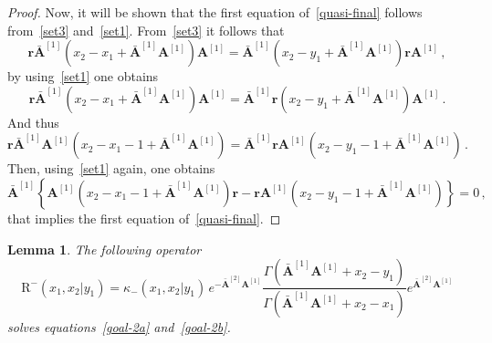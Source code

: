 \documentclass[11pt]{article}
\numberwithin{equation}{section}
\newtheorem{lemma}[theorem]{Lemma}
\newcommand{\OA}{\mathbf{A}}
\newcommand{\OAD}{\mathbf{\bar{A}}}
\newcommand{\abrOSCR}{\mathrm{R}}
\begin{document}
\begin{proof}
Now, it will be shown that the first equation of~\eqref{quasi-final} follows from~\eqref{set3} and~\eqref{set1}. From~\eqref{set3} it follows that
\begin{equation}
    	\mathbf{r}{\OAD}^{[1]}(x_{2}-x_{1}+\OAD^{[1]}\OA^{[1]})\OA^{[1]}={\OAD}^{[1]}(x_{2}-y_{1}+\OAD^{[1]}\OA^{[1]})\mathbf{r}\OA^{[1]}\,,
\end{equation}
by using~\eqref{set1} one obtains
\begin{equation}
    	\mathbf{r}{\OAD}^{[1]}(x_{2}-x_{1}+\OAD^{[1]}\OA^{[1]})\OA^{[1]}={\OAD}^{[1]}\mathbf{r}(x_{2}-y_{1}+\OAD^{[1]}\OA^{[1]})\OA^{[1]}\,.
\end{equation}
And thus
\begin{equation}
    	\mathbf{r}{\OAD}^{[1]}\OA^{[1]}(x_{2}-x_{1}-1+\OAD^{[1]}\OA^{[1]})={\OAD}^{[1]}\mathbf{r}\OA^{[1]}(x_{2}-y_{1}-1+\OAD^{[1]}\OA^{[1]})\,.
\end{equation}
Then, using~\eqref{set1} again, one obtains
\begin{equation}
    	{\OAD}^{[1]}\left\{\OA^{[1]}(x_{2}-x_{1}-1+\OAD^{[1]}\OA^{[1]})\mathbf{r}-\mathbf{r}\OA^{[1]}(x_{2}-y_{1}-1+\OAD^{[1]}\OA^{[1]})\right\}=0\,,
\end{equation}
that implies the first equation of~\eqref{quasi-final}.
\end{proof}

\begin{lemma}\label{Lemma-solution-def}
	The following operator
	\begin{equation}
		\abrOSCR^-(x_1,x_2|y_1)=\kappa_-(x_1,x_2|y_1)\,e^{-\OAD^{[2]}\OA^{[1]}}\frac{\Gamma(\OAD^{[1]}\OA^{[1]}+x_2-y_1)}{\Gamma(\OAD^{[1]}\OA^{[1]}+x_2-x_1)}e^{\OAD^{[2]}\OA^{[1]}}
	\end{equation}
	solves equations~\eqref{goal-2a} and~\eqref{goal-2b}.
\end{lemma}
\end{document}
